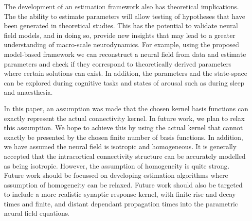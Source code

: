 \documentclass[10pt]{article}
\begin{document}
The development of an estimation framework also has theoretical implications. The the ability to estimate parameters will allow testing of hypotheses that have been generated in theoretical studies. This has the potential to validate neural field models, and in doing so, provide new insights that may lead to a greater understanding of macro-scale neurodynamics. For example, using the proposed model-based framework we can reconstruct a neural field from data and estimate parameters and check if they correspond to theoretically derived parameters where certain solutions can exist. In addition, the parameters and the state-space can be explored during cognitive tasks and states of arousal such as during sleep and anaesthesia. 

In this paper, an assumption was made that the chosen kernel basis functions can exactly represent the actual connectivity kernel. In future work, we plan to relax this assumption. We hope to achieve this by using the actual kernel that cannot exactly be presented by the chosen finite number of basis functions. In addition, we have assumed the neural field is isotropic and homogeneous. It is generally accepted that the intracortical connectivity structure can be accurately modelled as being isotropic. However, the assumption of homogeneity is quite strong. Future work should be focussed on developing estimation algorithms where assumption of homogeneity can be relaxed. Future work should also be targeted to include a more realistic synaptic response kernel, with finite rise and decay times and finite, and distant dependant propagation times into the parametric neural field equations.

\end{document}

